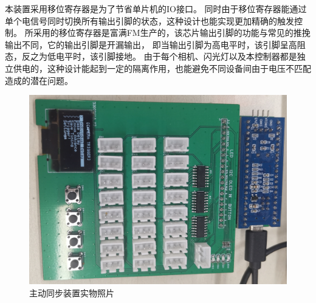 \documentclass{ctexart}
\begin{document}
本装置采用移位寄存器是为了节省单片机的IO接口。
同时由于移位寄存器能通过单个电信号同时切换所有输出引脚的状态，这种设计也能实现更加精确的触发控制。
所采用的移位寄存器是富满FM生产的，该芯片输出引脚的功能与常见的推挽输出不同，它的输出引脚是开漏输出，
即当输出引脚为高电平时，该引脚呈高阻态，反之为低电平时，该引脚接地。
由于每个相机、闪光灯以及本控制器都是独立供电的，这种设计能起到一定的隔离作用，也能避免不同设备间由于电压不匹配造成的潜在问题。

\begin{figure}
    \centering
    \includegraphics[width=\textwidth]{figures/active_sync_photo.jpg}
    \caption{主动同步装置实物照片}
    \label{fig:active_sync_photo}
\end{figure}
\end{document}

